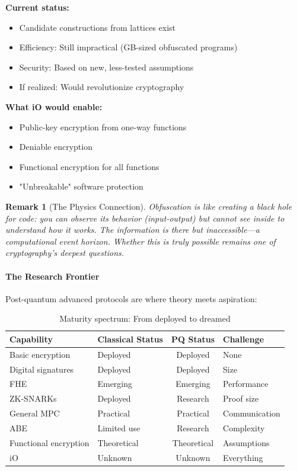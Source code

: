 \documentclass[11pt,a4paper]{article}
\newtheorem{remark}{Remark}
\begin{document}
\textbf{Current status:}
\begin{itemize}
    \item Candidate constructions from lattices exist
    \item Efficiency: Still impractical (GB-sized obfuscated programs)
    \item Security: Based on new, less-tested assumptions
    \item If realized: Would revolutionize cryptography
\end{itemize}

\textbf{What iO would enable:}
\begin{itemize}
    \item Public-key encryption from one-way functions
    \item Deniable encryption
    \item Functional encryption for all functions
    \item "Unbreakable" software protection
\end{itemize}

\begin{remark}[The Physics Connection]
Obfuscation is like creating a black hole for code: you can observe its behavior (input-output) but cannot see inside to understand how it works. The information is there but inaccessible—a computational event horizon. Whether this is truly possible remains one of cryptography's deepest questions.
\end{remark}

\paragraph{The Research Frontier}

Post-quantum advanced protocols are where theory meets aspiration:

\begin{table}[h]
\centering
\begin{tabular}{|l|l|c|l|}
\hline
\textbf{Capability} & \textbf{Classical Status} & \textbf{PQ Status} & \textbf{Challenge} \\
\hline
Basic encryption & Deployed & Deployed & None \\
Digital signatures & Deployed & Deployed & Size \\
FHE & Emerging & Emerging & Performance \\
ZK-SNARKs & Deployed & Research & Proof size \\
General MPC & Practical & Practical & Communication \\
ABE & Limited use & Research & Complexity \\
Functional encryption & Theoretical & Theoretical & Assumptions \\
iO & Unknown & Unknown & Everything \\
\hline
\end{tabular}
\caption{Maturity spectrum: From deployed to dreamed}
\end{table}
\end{document}

